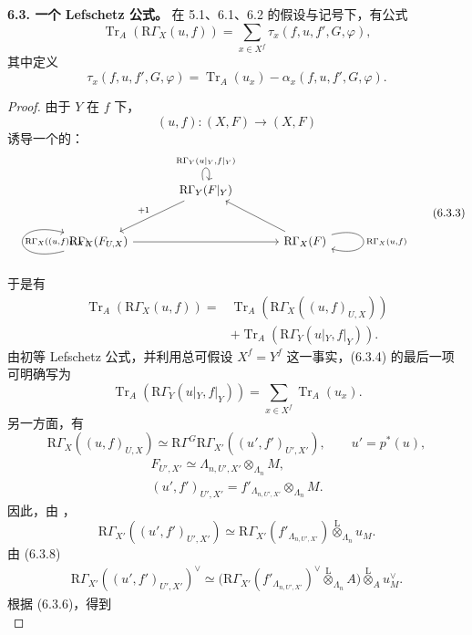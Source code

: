 \textbf{6.3. 一个 Lefschetz 公式。}
在 5.1、6.1、6.2 的假设与记号下，有公式
\[
\operatorname{Tr}_A(\mathrm R\Gamma_X(u,f))
=\sum_{x\in X^f}\tau_x(f,u,f',G,\varphi),
\tag{6.3.1}
\]
其中定义
\[
\tau_x(f,u,f',G,\varphi)
=\operatorname{Tr}_A(u_x)-\alpha_x(f,u,f',G,\varphi).
\tag{6.3.2}
\]
\begin{proof}
由于 $Y$ 在 $f$ 下，
\[
(u,f):(X,F)\longrightarrow(X,F)
\]
诱导一个的：
\[
\begin{tikzcd}[column sep=large,row sep=large]
&\mathrm R\Gamma_Y(F|_Y)
 \arrow[dl,"{+1}"']
 \arrow[loop above,"{\mathrm R\Gamma_Y(u|_Y,f|_Y)}"]&\\
\mathrm R\Gamma_X(F_{U,X})
 \arrow[rr]
 \arrow[loop left,"{\mathrm R\Gamma_X((u,f)_{U,X})}"']
&&\mathrm R\Gamma_X(F)
 \arrow[ul]
 \arrow[loop right,"{\mathrm R\Gamma_X(u,f)}"]
\end{tikzcd}
\tag{6.3.3}
\]
于是有
\[
\begin{aligned}
\operatorname{Tr}_A(\mathrm R\Gamma_X(u,f))
={}&\operatorname{Tr}_A(\mathrm R\Gamma_X((u,f)_{U,X}))\\
&+\operatorname{Tr}_A(\mathrm R\Gamma_Y(u|_Y,f|_Y)).
\end{aligned}
\tag{6.3.4}
\]
由初等 Lefschetz 公式，并利用总可假设 $X^f=Y^f$ 这一事实，(6.3.4) 的最后一项可明确写为
\[
\operatorname{Tr}_A(\mathrm R\Gamma_Y(u|_Y,f|_Y))
=\sum_{x\in X^f}\operatorname{Tr}_A(u_x).
\tag{6.3.5}
\]
另一方面，有
\[
\mathrm R\Gamma_X((u,f)_{U,X})
\simeq\mathrm R\Gamma^G\mathrm R\Gamma_{X'}((u',f')_{U',X'}),
\qquad u'=p^*(u),
\tag{6.3.6}
\]
\[
\begin{gathered}
F_{U',X'}\simeq\Lambda_{n,U',X'}\otimes_{\Lambda_n}M,\\
(u',f')_{U',X'}=f'_{\Lambda_{n,U',X'}}\otimes_{\Lambda_n}M.
\end{gathered}
\tag{6.3.7}
\]
因此，由 ，
\[
\mathrm R\Gamma_{X'}((u',f')_{U',X'})
\simeq\mathrm R\Gamma_{X'}(f'_{\Lambda_{n,U',X'}})
 \mathbin{\overset{\mathrm L}{\otimes}}_{\Lambda_n}u_M.
\tag{6.3.8}
\]
由 (6.3.8) 
\[
\begin{aligned}
\mathrm R\Gamma_{X'}((u',f')_{U',X'})^\vee
\simeq\bigl(\mathrm R\Gamma_{X'}(f'_{\Lambda_{n,U',X'}})^\vee
 \mathbin{\overset{\mathrm L}{\otimes}}_{\Lambda_n}A\bigr)
 \mathbin{\overset{\mathrm L}{\otimes}}_A u_M^\vee.
\end{aligned}
\tag{6.3.9}
\]
根据 (6.3.6)，得到
\[
\]
\end{proof}
